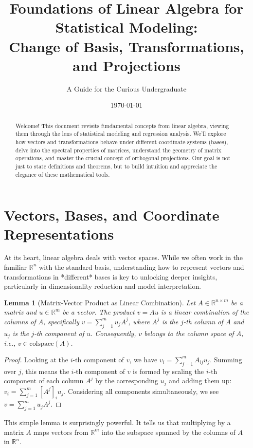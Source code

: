 \documentclass[11pt, a4paper]{article}
\title{\textbf{Foundations of Linear Algebra for Statistical Modeling: \\ Change of Basis, Transformations, and Projections}}
\author{A Guide for the Curious Undergraduate}
\date{\today}
\theoremstyle{mydefinitionstyle}
\theoremstyle{mytheoremstyle}
\newtheorem{lemma}{Lemma}[section]
\newcommand{\R}{\mathbb{R}}
\newcommand{\colspace}{\text{colspace}}
\begin{document}
\maketitle

\begin{abstract}
    Welcome! This document revisits fundamental concepts from linear algebra, viewing them through the lens of statistical modeling and regression analysis. We'll explore how vectors and transformations behave under different coordinate systems (bases), delve into the spectral properties of matrices, understand the geometry of matrix operations, and master the crucial concept of orthogonal projections. Our goal is not just to state definitions and theorems, but to build intuition and appreciate the elegance of these mathematical tools.
\end{abstract}

\section{Vectors, Bases, and Coordinate Representations}

At its heart, linear algebra deals with vector spaces. While we often work in the familiar $\R^n$ with the standard basis, understanding how to represent vectors and transformations in *different* bases is key to unlocking deeper insights, particularly in dimensionality reduction and model interpretation.

\begin{lemma}[Matrix-Vector Product as Linear Combination] \label{lemma:matmul_colspace}
    Let $A \in \R^{n \times m}$ be a matrix and $u \in \R^m$ be a vector. The product $v = Au$ is a linear combination of the columns of $A$, specifically $v = \sum_{j=1}^{m} u_j A^j$, where $A^j$ is the $j$-th column of $A$ and $u_j$ is the $j$-th component of $u$. Consequently, $v$ belongs to the column space of $A$, i.e., $v \in \colspace(A)$.
\end{lemma}
\begin{proof}
    Looking at the $i$-th component of $v$, we have $v_i = \sum_{j=1}^{m} A_{ij} u_j$. Summing over $j$, this means the $i$-th component of $v$ is formed by scaling the $i$-th component of each column $A^j$ by the corresponding $u_j$ and adding them up: $v_i = \sum_{j=1}^{m} [A^j]_i u_j$. Considering all components simultaneously, we see $v = \sum_{j=1}^{m} u_j A^j$.
\end{proof}
This simple lemma is surprisingly powerful. It tells us that multiplying by a matrix $A$ maps vectors from $\R^m$ into the subspace spanned by the columns of $A$ in $\R^n$.
\end{document}
